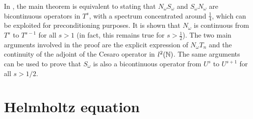 \documentclass[a4paper]{article}
\begin{document}
\begin{Rem}
	In \cite{bruno2012second}, the main theorem is equivalent to stating that $N_\omega S_\omega$ and $S_\omega N_\omega$ are bicontinuous operators in $T^s$, with a spectrum concentrated around $\frac{1}{4}$, which can be exploited for preconditioning purposes. It is shown that $N_\omega$ is continuous from $T^s$ to $T^{s-1}$ for all $s >1$ (in fact, this remains true for $s > \frac{1}{2}$). The two main arguments involved in the proof are the explicit expression of $N_\omega T_n$ and the continuity of the adjoint of the Cesaro operator in $l^2(\mathbb{N})$. The same arguments can be used to prove that $S_\omega$ is also a bicontinuous operator from $U^s$ to $U^{s+1}$ for all $s > 1/2$. 
\end{Rem}



\section{Helmholtz equation}
	
\end{document}
